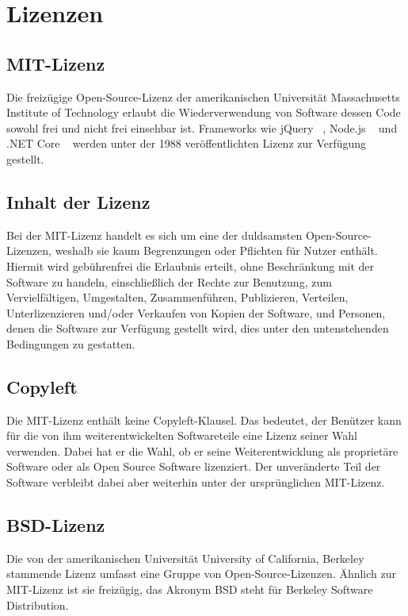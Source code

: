\chapter{Lizenzen}

\section{MIT-Lizenz}\label{sec:MIT}
Die freizügige Open-Source-Lizenz der amerikanischen Universität Massachusetts Institute of Technology erlaubt die Wiederverwendung von Software dessen Code sowohl frei und nicht frei einsehbar ist. Frameworks wie jQuery ~\cite{jQueryLicense}, Node.js ~\cite{NodeJsLicense} und .NET Core ~\cite{NetCoreLicense} werden unter der 1988 veröffentlichten Lizenz zur Verfügung gestellt.

\section*{Inhalt der Lizenz \cite{MITLicense}}
Bei der MIT-Lizenz handelt es sich um eine der duldsamsten Open-Source-Lizenzen, weshalb sie kaum Begrenzungen oder Pflichten für Nutzer enthält. Hiermit wird gebührenfrei die Erlaubnis erteilt, ohne Beschränkung mit der Software zu handeln, einschließlich der Rechte zur Benutzung, zum Vervielfältigen, Umgestalten, Zusammenführen, Publizieren, Verteilen, Unterlizenzieren und/oder Verkaufen von Kopien der Software, und Personen, denen die Software zur Verfügung gestellt wird, dies unter den untenstehenden Bedingungen zu gestatten.
\section*{Copyleft}
Die MIT-Lizenz enthält keine Copyleft-Klausel. Das bedeutet, der Benützer kann für die von ihm weiterentwickelten Softwareteile eine Lizenz seiner Wahl verwenden. Dabei hat er die Wahl, ob er seine Weiterentwicklung als proprietäre Software oder als Open Source Software lizenziert.  Der unveränderte Teil der Software verbleibt dabei aber weiterhin unter der ursprünglichen MIT-Lizenz.

\newpage


\section{BSD-Lizenz}\label{sec:BSD}
Die von der amerikanischen Universität University of California, Berkeley stammende Lizenz umfasst eine Gruppe von Open-Source-Lizenzen. Ähnlich zur MIT-Lizenz ist sie freizügig, das Akronym BSD steht für Berkeley Software Distribution.

